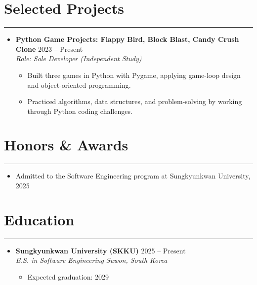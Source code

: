\documentclass[letterpaper, 10pt]{article}
\begin{document}
\section*{Selected Projects}
\hrule
\vspace{4pt}
\begin{itemize}
    \item[]
        \textbf{Python Game Projects: Flappy Bird, Block Blast, Candy Crush Clone} \hfill 2023 -- Present \\
        \textit{Role: Sole Developer (Independent Study)}
        \begin{itemize}
            \item Built three games in Python with Pygame, applying game-loop design and object-oriented programming.
            \item Practiced algorithms, data structures, and problem-solving by working through Python coding challenges.
        \end{itemize}
\end{itemize}

\section*{Honors \& Awards}
\hrule
\vspace{4pt}
\begin{itemize}
    \item Admitted to the Software Engineering program at Sungkyunkwan University, 2025
\end{itemize}

\section*{Education}
\hrule
\vspace{4pt}
\begin{itemize}
    \item[]
        \textbf{Sungkyunkwan University (SKKU)} \hfill 2025 -- Present \\
        \textit{B.S. in Software Engineering} \hfill \textit{Suwon, South Korea}
        \begin{itemize}
            \item Expected graduation: 2029
        \end{itemize}
\end{itemize}
\end{document}
